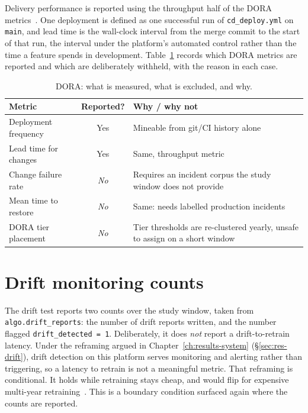 Delivery performance is reported using the throughput half of the DORA
metrics~\cite{forsgren2018accelerate}. One deployment is defined as one
successful run of \texttt{cd\_deploy.yml} on \texttt{main}, and lead time is the
wall-clock interval from the merge commit to the start of that run, the
interval under the platform's automated control rather than the time a feature
spends in development. Table~\ref{tab:ef-dora-scope} records which DORA metrics
are reported and which are deliberately withheld, with the reason in each case.

\begin{table}[h]
  \centering
  \caption{DORA: what is measured, what is excluded, and why.}
  \label{tab:ef-dora-scope}
  \begin{tabularx}{\linewidth}{@{}l c X@{}}
    \toprule
    \textbf{Metric} & \textbf{Reported?} & \textbf{Why / why not} \\
    \midrule
    Deployment frequency      & Yes & Mineable from git/CI history alone~\cite{forsgren2018accelerate} \\
    Lead time for changes     & Yes & Same, throughput metric \\
    Change failure rate       & \emph{No} & Requires an incident corpus the study window does not provide \\
    Mean time to restore      & \emph{No} & Same: needs labelled production incidents \\
    DORA tier placement       & \emph{No} & Tier thresholds are re-clustered yearly, unsafe to assign on a short window \\
    \bottomrule
  \end{tabularx}
\end{table}

\section{Drift monitoring counts}
\label{sec:ef-drift}

The drift test reports two counts over the study window, taken from
\texttt{algo.drift\_reports}: the number of drift reports written, and the number
flagged \texttt{drift\_detected = 1}. Deliberately, it does \emph{not} report a
drift-to-retrain latency. Under the reframing argued in
Chapter~\ref{ch:results-system} (\S\ref{sec:res-drift}), drift detection on this
platform serves monitoring and alerting rather than triggering, so a latency to
retrain is not a meaningful metric. That reframing is conditional. It holds while
retraining stays cheap, and would flip for expensive multi-year
retraining~\cite{mahadevan2024costaware}. This is a boundary condition surfaced
again where the counts are reported.

